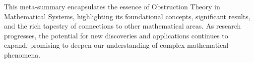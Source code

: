 \documentclass[11pt,a4paper]{article}
\begin{document}
This meta-summary encapsulates the essence of Obstruction Theory in Mathematical Systems, highlighting its foundational concepts, significant results, and the rich tapestry of connections to other mathematical areas. As research progresses, the potential for new discoveries and applications continues to expand, promising to deepen our understanding of complex mathematical phenomena.
\end{document}
